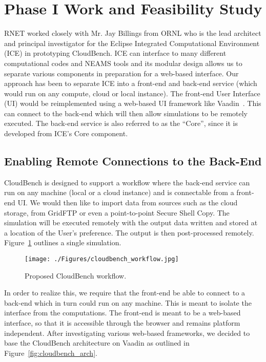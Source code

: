\section{Phase I Work and Feasibility Study}

RNET worked closely with Mr. Jay Billings from ORNL who is the lead architect 
and principal investigator for the Eclipse Integrated Computational Environment 
(ICE) in prototyping CloudBench. ICE can interface to many different 
computational codes and NEAMS tools and its modular design allows us to 
separate various components in preparation for a web-based interface. Our 
approach has been to separate ICE into a front-end and back-end service (which 
would run on any compute, cloud or local instance). The front-end User 
Interface (UI) would be reimplemented using a web-based UI framework like 
Vaadin~\cite{vaadin}. This can connect to the back-end which will then allow 
simulations to be remotely executed. The back-end service is also referred to 
as the ``Core'', since it is developed from ICE's Core component.

\subsection{Enabling Remote Connections to the Back-End}
\label{sec:remote_backend}
CloudBench is designed to support a workflow where the back-end service can run 
on any machine (local or a cloud instance) and is connectable from a front-end 
UI.  We would then like to import data from sources such as the cloud storage, 
from GridFTP or even a point-to-point Secure Shell Copy. The simulation will be 
executed remotely with the output data written and stored at a location of the 
User's preference. The output is then post-processed remotely. 
Figure~\ref{fig:cloudbench_workflow} outlines a single simulation.

\begin{figure}[thb]
\begin{center}
\leavevmode
\texttt{[image: ./Figures/cloudbench\_workflow.jpg]}
\end{center}
\caption{Proposed CloudBench workflow.}
\label{fig:cloudbench_workflow}
\end{figure}

In order to realize this, we require that the front-end be able to connect to a 
back-end which in turn could run on any machine. This is meant to isolate the 
interface from the computations. The front-end is meant to be a 
web-based interface, so that it is accessible through the browser and remains 
platform independent. After investigating various web-based frameworks, we 
decided to base the CloudBench architecture on Vaadin as outlined in 
Figure~\ref{fig:cloudbench_arch}.

